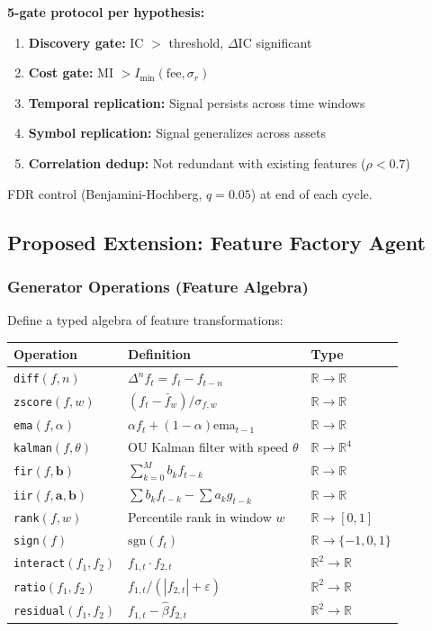 \documentclass[11pt,a4paper]{article}
\begin{document}
\textbf{5-gate protocol per hypothesis:}
\begin{enumerate}
    \item \textbf{Discovery gate:} IC $>$ threshold, $\Delta$IC significant
    \item \textbf{Cost gate:} MI $> I_{\min}(\text{fee}, \sigma_r)$
    \item \textbf{Temporal replication:} Signal persists across time windows
    \item \textbf{Symbol replication:} Signal generalizes across assets
    \item \textbf{Correlation dedup:} Not redundant with existing features ($\rho < 0.7$)
\end{enumerate}

FDR control (Benjamini-Hochberg, $q = 0.05$) at end of each cycle.

\subsection{Proposed Extension: Feature Factory Agent}

\subsubsection{Generator Operations (Feature Algebra)}

Define a typed algebra of feature transformations:

\begin{center}
\begin{tabular}{l l l}
\hline
\textbf{Operation} & \textbf{Definition} & \textbf{Type} \\
\hline
\texttt{diff}$(f, n)$ & $\Delta^n f_t = f_t - f_{t-n}$ & $\mathbb{R} \to \mathbb{R}$ \\
\texttt{zscore}$(f, w)$ & $(f_t - \bar{f}_w) / \sigma_{f,w}$ & $\mathbb{R} \to \mathbb{R}$ \\
\texttt{ema}$(f, \alpha)$ & $\alpha f_t + (1-\alpha) \text{ema}_{t-1}$ & $\mathbb{R} \to \mathbb{R}$ \\
\texttt{kalman}$(f, \theta)$ & OU Kalman filter with speed $\theta$ & $\mathbb{R} \to \mathbb{R}^4$ \\
\texttt{fir}$(f, \mathbf{b})$ & $\sum_{k=0}^{M} b_k f_{t-k}$ & $\mathbb{R} \to \mathbb{R}$ \\
\texttt{iir}$(f, \mathbf{a}, \mathbf{b})$ & $\sum b_k f_{t-k} - \sum a_k g_{t-k}$ & $\mathbb{R} \to \mathbb{R}$ \\
\texttt{rank}$(f, w)$ & Percentile rank in window $w$ & $\mathbb{R} \to [0,1]$ \\
\texttt{sign}$(f)$ & $\text{sgn}(f_t)$ & $\mathbb{R} \to \{-1,0,1\}$ \\
\texttt{interact}$(f_1, f_2)$ & $f_{1,t} \cdot f_{2,t}$ & $\mathbb{R}^2 \to \mathbb{R}$ \\
\texttt{ratio}$(f_1, f_2)$ & $f_{1,t} / (|f_{2,t}| + \varepsilon)$ & $\mathbb{R}^2 \to \mathbb{R}$ \\
\texttt{residual}$(f_1, f_2)$ & $f_{1,t} - \hat{\beta} f_{2,t}$ & $\mathbb{R}^2 \to \mathbb{R}$ \\
\hline
\end{tabular}
\end{center}
\end{document}
